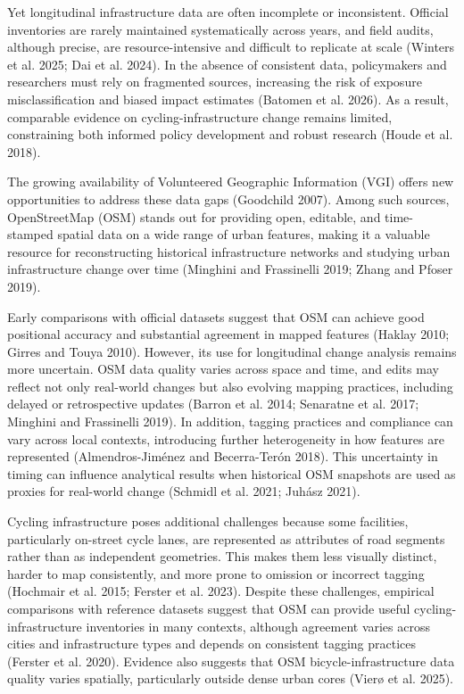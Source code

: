 \documentclass[
]{article}
\begin{document}
Yet longitudinal infrastructure data are often incomplete or
inconsistent. Official inventories are rarely maintained systematically
across years, and field audits, although precise, are resource-intensive
and difficult to replicate at scale (Winters et al. 2025; Dai et al.
2024). In the absence of consistent data, policymakers and researchers
must rely on fragmented sources, increasing the risk of exposure
misclassification and biased impact estimates (Batomen et al. 2026). As
a result, comparable evidence on cycling-infrastructure change remains
limited, constraining both informed policy development and robust
research (Houde et al. 2018).

The growing availability of Volunteered Geographic Information (VGI)
offers new opportunities to address these data gaps (Goodchild 2007).
Among such sources, OpenStreetMap (OSM) stands out for providing open,
editable, and time-stamped spatial data on a wide range of urban
features, making it a valuable resource for reconstructing historical
infrastructure networks and studying urban infrastructure change over
time (Minghini and Frassinelli 2019; Zhang and Pfoser 2019).

Early comparisons with \color{black}official datasets \color{black}
suggest that OSM can achieve good positional accuracy and substantial
agreement in mapped features (Haklay 2010; Girres and Touya 2010).
However, its use for longitudinal change analysis remains more
uncertain. OSM data quality varies across space and time, and edits may
reflect not only real-world changes but also evolving mapping practices,
including delayed or retrospective updates (Barron et al. 2014;
Senaratne et al. 2017; Minghini and Frassinelli 2019). In addition,
tagging practices and compliance can vary across local contexts,
introducing further heterogeneity in how features are represented
(Almendros-Jiménez and Becerra-Terón 2018). This uncertainty in timing
can influence analytical results when historical OSM snapshots are used
as proxies for real-world change (Schmidl et al. 2021; Juhász 2021).

Cycling infrastructure poses additional challenges because some
facilities, particularly on-street cycle lanes, are represented as
attributes of road segments rather than as independent geometries. This
makes them less visually distinct, harder to map consistently, and more
prone to omission or incorrect tagging (Hochmair et al. 2015; Ferster et
al. 2023). Despite these challenges, empirical comparisons with
reference datasets suggest that OSM can provide useful
cycling-infrastructure inventories in many contexts, although agreement
varies across cities and infrastructure types and depends on consistent
tagging practices (Ferster et al. 2020). Evidence also suggests that OSM
bicycle-infrastructure data quality varies spatially, particularly
outside dense urban cores (Vierø et al. 2025).
\end{document}
